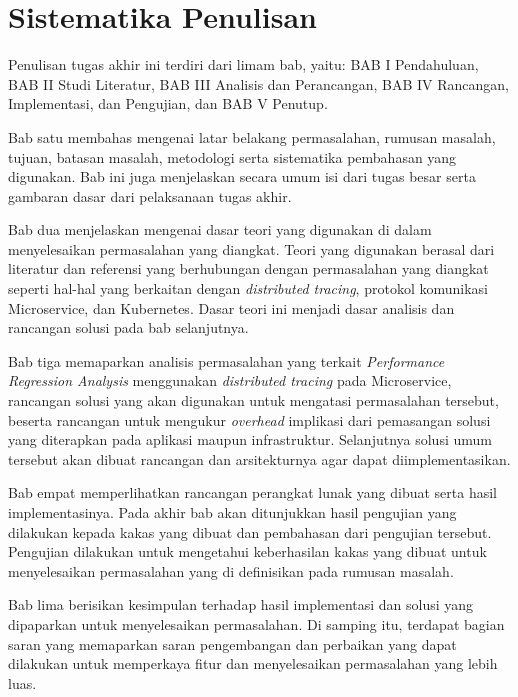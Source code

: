 \section{Sistematika Penulisan}

Penulisan tugas akhir ini terdiri dari limam bab, yaitu: BAB I Pendahuluan, BAB II Studi Literatur, BAB III Analisis dan Perancangan, BAB IV Rancangan, Implementasi, dan Pengujian, dan BAB V Penutup.

Bab satu membahas mengenai latar belakang permasalahan, rumusan masalah, tujuan, batasan masalah, metodologi serta sistematika pembahasan yang digunakan. Bab ini juga menjelaskan secara umum isi dari tugas besar serta gambaran dasar dari pelaksanaan tugas akhir.

Bab dua menjelaskan mengenai dasar teori yang digunakan di dalam menyelesaikan permasalahan yang diangkat. Teori yang digunakan berasal dari literatur dan referensi yang berhubungan dengan permasalahan yang diangkat seperti hal-hal yang berkaitan dengan \textit{distributed tracing}, protokol komunikasi Microservice, dan Kubernetes. Dasar teori ini menjadi dasar analisis dan rancangan solusi pada bab selanjutnya.

Bab tiga memaparkan analisis permasalahan yang terkait \textit{Performance Regression Analysis} menggunakan \textit{distributed tracing} pada Microservice, rancangan solusi yang akan digunakan untuk mengatasi permasalahan tersebut, beserta rancangan untuk mengukur \textit{overhead} implikasi dari pemasangan solusi yang diterapkan pada aplikasi maupun infrastruktur. Selanjutnya solusi umum tersebut akan dibuat rancangan dan arsitekturnya agar dapat diimplementasikan.

Bab empat memperlihatkan rancangan perangkat lunak yang dibuat serta hasil implementasinya. Pada akhir bab akan ditunjukkan hasil pengujian yang dilakukan kepada kakas yang dibuat dan pembahasan dari pengujian tersebut. Pengujian dilakukan untuk mengetahui keberhasilan kakas yang dibuat untuk menyelesaikan permasalahan yang di definisikan pada rumusan masalah.

Bab lima berisikan kesimpulan terhadap hasil implementasi dan solusi yang dipaparkan untuk menyelesaikan permasalahan. Di samping itu, terdapat bagian saran yang memaparkan saran pengembangan dan perbaikan yang dapat dilakukan untuk memperkaya fitur dan menyelesaikan permasalahan yang lebih luas.

